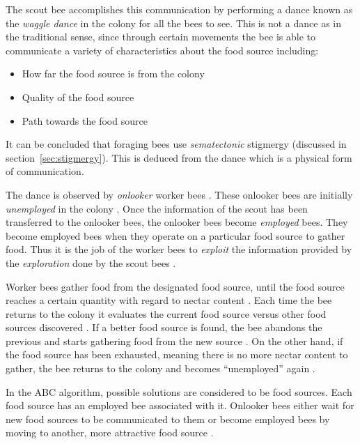 The scout bee accomplishes this communication by performing a dance known as the \emph{waggle dance} in the colony for all the bees to see\cite{ABCCompareStudy}. This is not a dance as in the traditional sense, since through certain movements the bee is able to communicate a variety of characteristics about the food source including\cite{ABCCompareStudy}:
\begin{itemize}
\item How far the food source is from the colony
\item Quality of the food source
\item Path towards the food source
\end{itemize}

It can be concluded that foraging bees use \emph{sematectonic} stigmergy (discussed in section~\ref{sec:stigmergy}). This is deduced from the dance which is a physical form of communication.

The dance is observed by \emph{onlooker} worker bees \cite{ABCCompareStudy,ABCImageEnhancement}. These onlooker bees are initially \emph{unemployed} in the colony \cite{ABCCompareStudy,ABCImageEnhancement}. Once the information of the scout has been transferred to the onlooker bees, the onlooker bees become \emph{employed} bees\cite{ABCCompareStudy,ABCImageEnhancement}. They become employed bees when they operate on a particular food source to gather food\cite{ABCCompareStudy,ABCImageEnhancement}. Thus it is the job of the worker bees to \emph{exploit} the information provided by the \emph{exploration} done by the scout bees \cite{ABCCompareStudy,ABCNumericalOptimization}. 

Worker bees gather food from the designated food source, until the food source reaches a certain quantity with regard to nectar content \cite{ABCCompareStudy,ABCNumericalOptimization}. Each time the bee returns to the colony it evaluates the current food source versus other food sources discovered \cite{ABCCompareStudy,ABCNumericalOptimization}. If a better food source is found, the bee abandons the previous and starts gathering food from the new source \cite{ABCCompareStudy,ABCNumericalOptimization}. On the other hand, if the food source has been exhausted, meaning there is no more nectar content to gather, the bee returns to the colony and becomes ``unemployed'' again \cite{ABCCompareStudy,ABCNumericalOptimization}.

In the ABC algorithm, possible solutions are considered to be food sources\cite{ABCCompareStudy,ABCNumericalOptimization}. Each food source has an employed bee associated with it. Onlooker bees either wait for new food sources to be communicated to them or become employed bees by moving to another, more attractive food source \cite{ABCCompareStudy,ABCNumericalOptimization}. 

